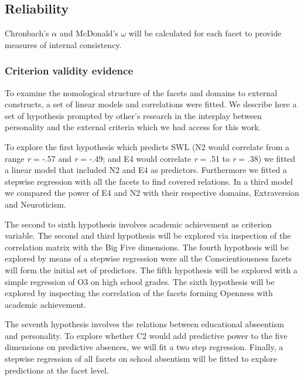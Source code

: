 \documentclass[,man,floatsintext]{apa6}
\theoremstyle{definition}
\theoremstyle{definition}
\theoremstyle{definition}
\theoremstyle{remark}
\begin{document}
\hypertarget{reliability}{%
\subsection{Reliability}\label{reliability}}

Chronbach's \(\alpha\) and McDonald's \(\omega\) will be calculated for
each facet to provide measures of internal consistency.

\hypertarget{criterion-validity-evidence}{%
\subsubsection{Criterion validity
evidence}\label{criterion-validity-evidence}}

To examine the nomological structure of the facets and domains to
external constructs, a set of linear models and correlations were
fitted. We describe here a set of hypothesis prompted by other's
research in the interplay between personality and the external criteria
which we had access for this work.

To explore the first hypothesis which predicts SWL (N2 would correlate
from a range \emph{r} = -.57 and \emph{r} = -.49; and E4 would correlate
\emph{r} = .51 to \emph{r} = .38) we fitted a linear model that included
N2 and E4 as predictors. Furthermore we fitted a stepwise regression
with all the facets to find covered relations. In a third model we
compared the power of E4 and N2 with their respective domains,
Extraversion and Neuroticism.

The second to sixth hypothesis involves academic achievement as
criterion variable. The second and third hypothesis will be explored via
inspection of the correlation matrix with the Big Five dimensions. The
fourth hypothesis will be explored by means of a stepwise regression
were all the Conscientiousness facets will form the initial set of
predictors. The fifth hypothesis will be explored with a simple
regression of O3 on high school grades. The sixth hypothesis will be
explored by inspecting the correlation of the facets forming Openness
with academic achievement.

The seventh hypothesis involves the relations between educational
abseentism and personality. To explore whether C2 would add predictive
power to the five dimensions on predictive absences, we will fit a two
step regression. Finally, a stepwise regression of all facets on school
absentism will be fitted to explore predictions at the facet level.
\end{document}
